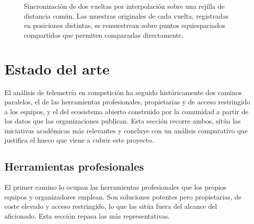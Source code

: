 \documentclass[12pt,a4paper,twoside,openright]{book}
\begin{document}
\begin{figure}[H]
  \centering
  \caption{Sincronización de dos vueltas por interpolación sobre una rejilla de distancia común. Las muestras originales de cada vuelta, registradas en posiciones distintas, se remuestrean sobre puntos equiespaciados compartidos que permiten compararlas directamente.}
  \label{fig:sincronizacion}
\end{figure}

\section{Estado del arte}
El análisis de telemetría en competición ha seguido históricamente dos caminos paralelos, el de las herramientas profesionales, propietarias y de acceso restringido a los equipos, y el del ecosistema abierto construido por la comunidad a partir de los datos que las organizaciones publican. Esta sección recorre ambos, sitúa las iniciativas académicas más relevantes y concluye con un análisis comparativo que justifica el hueco que viene a cubrir este proyecto.
\subsection{Herramientas profesionales}
El primer camino lo ocupan las herramientas profesionales que los propios equipos y organizadores emplean. Son soluciones potentes pero propietarias, de coste elevado y acceso restringido, lo que las sitúa fuera del alcance del aficionado. Esta sección repasa las más representativas.
\end{document}
